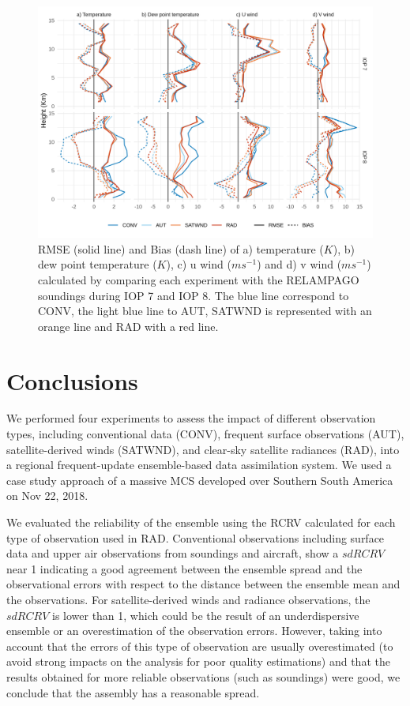 \documentclass[final,5p,times,twocolumn,authoryear]{elsarticle} %
\begin{document}
\begin{figure}[t]

{\centering \includegraphics{../figures/soundings-1} 

}

\caption{RMSE (solid line) and Bias (dash line) of a) temperature (\(K\)), b) dew point temperature (\(K\)), c) u wind (\(ms^{-1}\)) and d) v wind (\(ms^{-1}\)) calculated by comparing each experiment with the RELAMPAGO soundings during IOP 7 and IOP 8. The blue line correspond to CONV, the light blue line to AUT, SATWND is represented with an orange line and RAD with a red line.}\label{fig:soundings}
\end{figure}

\hypertarget{conclusions}{%
\section{Conclusions}\label{conclusions}}

We performed four experiments to assess the impact of different observation types, including conventional data (CONV), frequent surface observations (AUT), satellite-derived winds (SATWND), and clear-sky satellite radiances (RAD), into a regional frequent-update ensemble-based data assimilation system. We used a case study approach of a massive MCS developed over Southern South America on Nov 22, 2018.

We evaluated the reliability of the ensemble using the RCRV calculated for each type of observation used in RAD. Conventional observations including surface data and upper air observations from soundings and aircraft, show a \(sd RCRV\) near 1 indicating a good agreement between the ensemble spread and the observational errors with respect to the distance between the ensemble mean and the observations. For satellite-derived winds and radiance observations, the \(sd RCRV\) is lower than 1, which could be the result of an underdispersive ensemble or an overestimation of the observation errors. However, taking into account that the errors of this type of observation are usually overestimated (to avoid strong impacts on the analysis for poor quality estimations) and that the results obtained for more reliable observations (such as soundings) were good, we conclude that the assembly has a reasonable spread.
\end{document}
